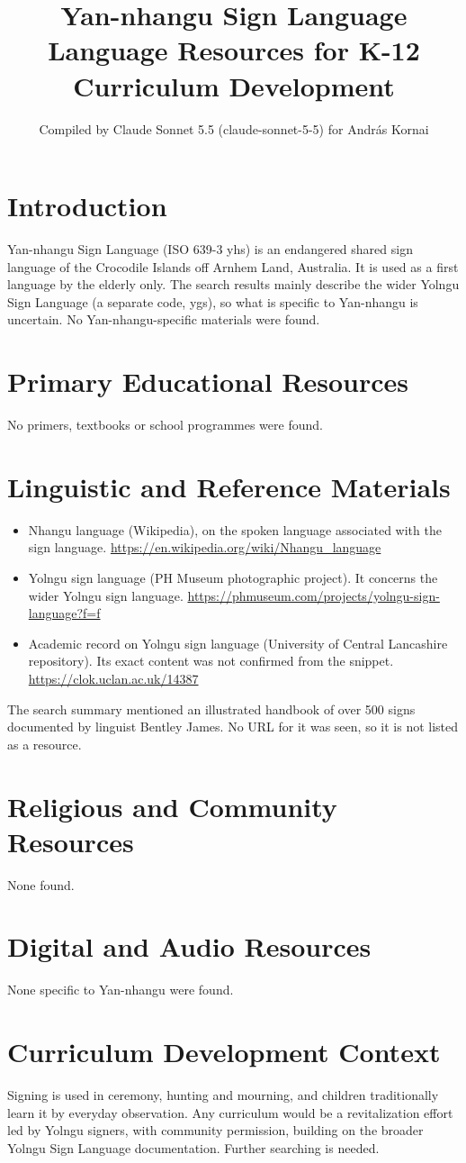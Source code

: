 \documentclass[12pt]{article}
\title{Yan-nhangu Sign Language Language Resources for K-12 Curriculum Development}
\author{Compiled by Claude Sonnet 5.5 (claude-sonnet-5-5) for Andr\'as Kornai}
\date{}
\begin{document}
\maketitle

\section{Introduction}
Yan-nhangu Sign Language (ISO 639-3 yhs) is an endangered shared sign language of the Crocodile Islands off Arnhem Land, Australia. It is used as a first language by the elderly only. The search results mainly describe the wider Yolngu Sign Language (a separate code, ygs), so what is specific to Yan-nhangu is uncertain. No Yan-nhangu-specific materials were found.

\section{Primary Educational Resources}
No primers, textbooks or school programmes were found.

\section{Linguistic and Reference Materials}
\begin{itemize}
\item Nhangu language (Wikipedia), on the spoken language associated with the sign language. \url{https://en.wikipedia.org/wiki/Nhangu_language}
\item Yolngu sign language (PH Museum photographic project). It concerns the wider Yolngu sign language. \url{https://phmuseum.com/projects/yolngu-sign-language?f=f}
\item Academic record on Yolngu sign language (University of Central Lancashire repository). Its exact content was not confirmed from the snippet. \url{https://clok.uclan.ac.uk/14387}
\end{itemize}
The search summary mentioned an illustrated handbook of over 500 signs documented by linguist Bentley James. No URL for it was seen, so it is not listed as a resource.

\section{Religious and Community Resources}
None found.

\section{Digital and Audio Resources}
None specific to Yan-nhangu were found.

\section{Curriculum Development Context}
Signing is used in ceremony, hunting and mourning, and children traditionally learn it by everyday observation. Any curriculum would be a revitalization effort led by Yolngu signers, with community permission, building on the broader Yolngu Sign Language documentation. Further searching is needed.
\end{document}
